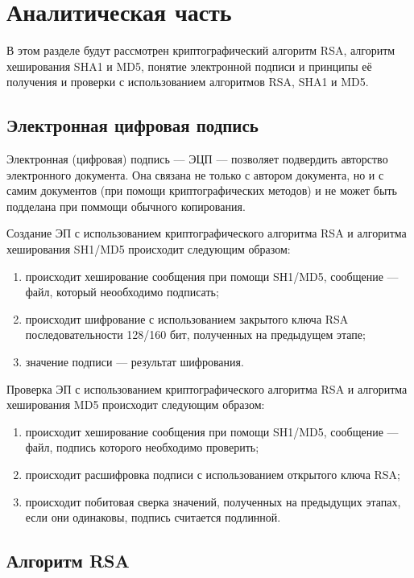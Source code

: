 \chapter{Аналитическая часть}

В этом разделе будут рассмотрен криптографический алгоритм RSA, алгоритм хеширования SHA1 и MD5, понятие электронной подписи и принципы её получения и проверки с использованием алгоритмов RSA, SHA1 и MD5.

\section{Электронная цифровая подпись}

Электронная (цифровая) подпись --- ЭЦП --- позволяет подвердить авторство электронного документа. Она связана не только с автором документа, но и с самим документов (при помощи криптографических методов) и не может быть подделана при поммощи обычного копирования.

Создание ЭП с использованием криптографического алгоритма RSA и алгоритма хеширования SH1/MD5 происходит следующим образом:
\begin{enumerate}[label=\arabic*)]
	\item происходит хеширование сообщения при помощи SH1/MD5, сообщение --- файл, который неообходимо подписать;
	\item происходит шифрование с использованием закрытого ключа RSA последовательности 128/160 бит, полученных на предыдущем этапе;
	\item значение подписи --- результат шифрования.
\end{enumerate}

Проверка ЭП с использованием криптографического алгоритма RSA и алгоритма хеширования MD5 происходит следующим образом:
\begin{enumerate}[label=\arabic*)]
	\item происходит хеширование сообщения при помощи SH1/MD5, сообщение --- файл, подпись которого необходимо проверить;
	\item происходит расшифровка
	 подписи с использованием открытого ключа RSA;
	\item происходит побитовая сверка значений, полученных на предыдущих этапах, если они одинаковы, подпись считается подлинной.
\end{enumerate}

\section{Алгоритм RSA}

